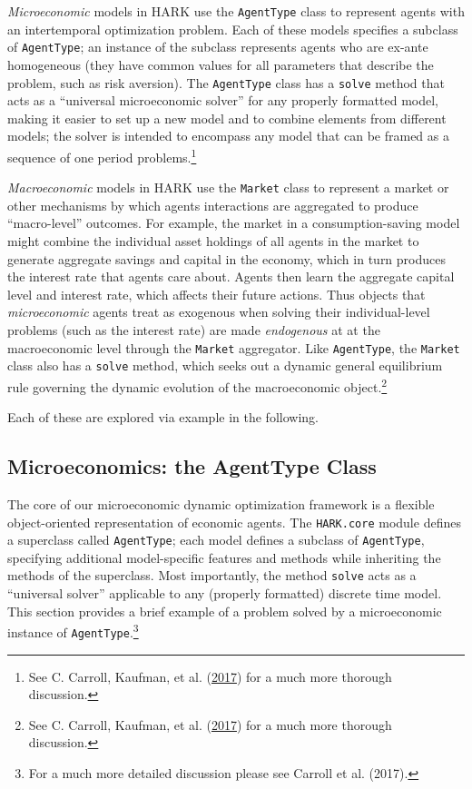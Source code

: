\documentclass[10pt,twocolumn]{article}
\let\rmarkdownfootnote\footnote%
\def\footnote{\protect\rmarkdownfootnote}
\begin{document}
\emph{Microeconomic} models in HARK use the \texttt{AgentType} class to
represent agents with an intertemporal optimization problem. Each of
these models specifies a subclass of \texttt{AgentType}; an instance of
the subclass represents agents who are ex-ante homogeneous (they have
common values for all parameters that describe the problem, such as risk
aversion). The \texttt{AgentType} class has a \texttt{solve} method that
acts as a ``universal microeconomic solver'' for any properly formatted
model, making it easier to set up a new model and to combine elements
from different models; the solver is intended to encompass any model
that can be framed as a sequence of one period problems.\footnote{See C.
  Carroll, Kaufman, et al.
  (\protect\hyperlink{ref-carroll2017harkmanual}{2017}) for a much more
  thorough discussion.}

\emph{Macroeconomic} models in HARK use the \texttt{Market} class to
represent a market or other mechanisms by which agents interactions are
aggregated to produce ``macro-level'' outcomes. For example, the market
in a consumption-saving model might combine the individual asset
holdings of all agents in the market to generate aggregate savings and
capital in the economy, which in turn produces the interest rate that
agents care about. Agents then learn the aggregate capital level and
interest rate, which affects their future actions. Thus objects that
\emph{microeconomic} agents treat as exogenous when solving their
individual-level problems (such as the interest rate) are made
\emph{endogenous} at at the macroeconomic level through the
\texttt{Market} aggregator. Like \texttt{AgentType}, the \texttt{Market}
class also has a \texttt{solve} method, which seeks out a dynamic
general equilibrium rule governing the dynamic evolution of the
macroeconomic object.\footnote{See C. Carroll, Kaufman, et al.
  (\protect\hyperlink{ref-carroll2017harkmanual}{2017}) for a much more
  thorough discussion.}

Each of these are explored via example in the following.

\subsection{Microeconomics: the AgentType
Class}\label{microeconomics-the-agenttype-class}

The core of our microeconomic dynamic optimization framework is a
flexible object-oriented representation of economic agents. The
\texttt{HARK.core} module defines a superclass called \texttt{AgentType};
each model defines a subclass of \texttt{AgentType}, specifying
additional model-specific features and methods while inheriting the
methods of the superclass. Most importantly, the method \texttt{solve}
acts as a ``universal solver'' applicable to any (properly formatted)
discrete time model. This section provides a brief example of a problem
solved by a microeconomic instance of \texttt{AgentType}.\footnote{For a
  much more detailed discussion please see Carroll et al. (2017).}
\end{document}
